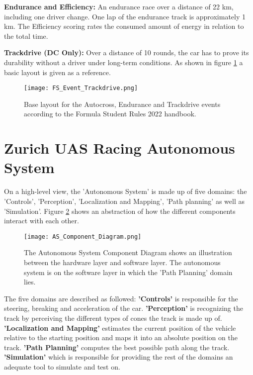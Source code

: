 \textbf{Endurance and Efficiency:} An endurance race over a distance of 22 km, including one driver change. One lap of the endurance track is approximately 1 km. The Efficiency scoring rates the consumed amount of energy in relation to the total time.

\textbf{Trackdrive (DC Only):}  Over a distance of 10 rounds, the car has to prove its durability without a driver under long-term conditions. As shown in figure \ref{fig:FS Autocross, Endurance and Trackdrive layout} a basic layout is given as a reference.
\begin{figure}[H]
    \centering
    \texttt{[image: FS\_Event\_Trackdrive.png]}
    \caption{Base layout for the Autocross, Endurance and Trackdrive events according to the Formula Student Rules 2022 handbook. \cite{fs_rules_2022_handbook}}
    \label{fig:FS Autocross, Endurance and Trackdrive layout}
\end{figure}

\section{Zurich UAS Racing Autonomous System}
On a high-level view, the 'Autonomous System' is made up of five domains: the 'Controls', 'Perception', 'Localization and Mapping', 'Path planning' as well as 'Simulation'. Figure \ref{fig:AS Component Diagram} shows an abstraction of how the different components interact with each other.
\begin{figure}[H]
    \centering
    \texttt{[image: AS\_Component\_Diagram.png]}
    \caption{The Autonomous System Component Diagram shows an illustration between the hardware layer and software layer. The autonomous system is on the software layer in which the 'Path Planning' domain lies.}
    \label{fig:AS Component Diagram}
\end{figure}
The five domains are described as followed: 
\textbf{'Controls'} is responsible for the steering, breaking and acceleration of the car.
\textbf{'Perception'} is recognizing the track by perceiving the different types of cones the track is made up of.
\textbf{'Localization and Mapping'} estimates the current position of the vehicle relative to the starting position and maps it into an absolute position on the track.
\textbf{'Path Planning'} computes the best possible path along the track.
\textbf{'Simulation'} which is responsible for providing the rest of the domains an adequate tool to simulate and test on.


